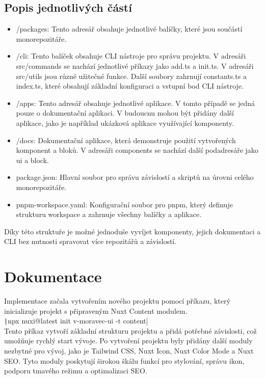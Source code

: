 \subsection{Popis jednotlivých částí}

\begin{itemize}
    \item /packages: Tento adresář obsahuje jednotlivé balíčky, které jsou součástí monorepozitáře.
    \item /cli: Tento balíček obsahuje CLI nástroje pro správu projektu. V adresáři src/commands se nachází jednotlivé příkazy jako add.ts a init.ts. V adresáři src/utils jsou různé užitečné funkce. Další soubory zahrnují constants.ts a index.ts, které obsahují základní konfiguraci a vstupní bod CLI nástroje.
    \item /apps: Tento adresář obsahuje jednotlivé aplikace. V tomto případě se jedná pouze o dokumentační aplikaci. V budoucnu mohou být přidány další aplikace, jako je například ukázková aplikace využívající komponenty.
    \item /docs: Dokumentační aplikace, která demonstruje použití vytvořených komponent a bloků. V adresáři components se nachází další podadresáře jako ui a block.
    \item package.json: Hlavní soubor pro správu závislostí a skriptů na úrovni celého monorepozitáře.
    \item pnpm-workspace.yaml: Konfigurační soubor pro pnpm, který definuje strukturu workspace a zahrnuje všechny balíčky a aplikace.
\end{itemize}

Díky této struktuře je možné jednoduše vyvíjet komponenty, jejich dokumentaci a CLI bez nutnosti spravovat více repozitářů a závislostí.

\section{Dokumentace}
Implementace začala vytvořením nového projektu pomocí příkazu, který inicializuje projekt s připraveným Nuxt Content modulem.\\

\texttt|npx nuxi@latest init v-moravec-ui -t content|\\

Tento příkaz vytvoří základní strukturu projektu a přidá potřebné závislosti, což umožňuje rychlý start vývoje. Po vytvoření projektu byly přidány další moduly nezbytné pro vývoj, jako je Tailwind CSS, Nuxt Icon, Nuxt Color Mode a Nuxt SEO. Tyto moduly poskytují širokou škálu funkcí pro stylování, správu ikon, podporu tmavého režimu a optimalizaci SEO.

